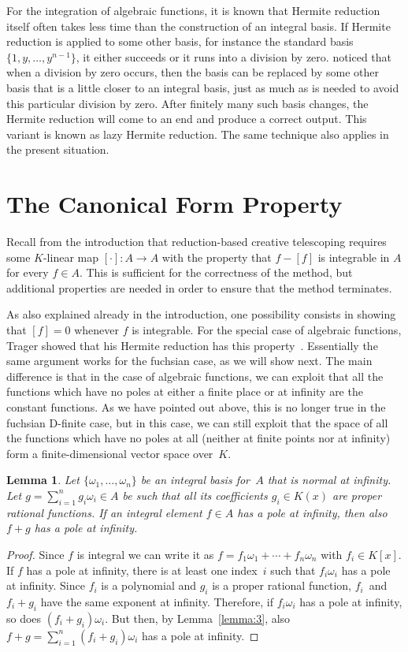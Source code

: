 \documentclass[final,1p,times,authoryear]{elsarticle}
\newtheorem{lemma}[theorem]{Lemma}
\begin{document}
For the integration of algebraic functions, it is known that Hermite reduction itself often
takes less time than the construction of an integral basis. If Hermite reduction is applied to some
other basis, for instance the standard basis $\{1,y,\dots,y^{n-1}\}$, it
either succeeds or it runs into a division by zero.
\cite{bronstein98a} noticed that when a division by zero occurs,
then the basis can be replaced by some other basis that is a little closer to
an integral basis, just as much as is needed to avoid this particular division
by zero. After finitely many such basis changes, the Hermite reduction will
come to an end and produce a correct output. This variant is known as lazy
Hermite reduction. The same technique also applies in the present situation.

\section{The Canonical Form Property}\label{sec:canonic}

Recall from the introduction that reduction-based creative telescoping requires
some $K$-linear map $[\cdot]\colon A\to A$ with the property that
$f-[f]$ is integrable in $A$ for every $f\in A$. This is sufficient for the
correctness of the method, but additional properties are needed in order to
ensure that the method terminates.

As also explained already in the introduction, one possibility consists in
showing that $[f]=0$ whenever $f$ is integrable. For the special case of
algebraic functions, Trager showed that his Hermite reduction has this
property~\citep[p.~50, Thm.~1]{trager84}. Essentially the same argument
works for the fuchsian case, as we will show next. The main difference is
that in the case of algebraic functions, we can exploit that all the functions
which have no poles at either a finite place or at infinity are the constant
functions. As we have pointed out above, this is no longer true in the fuchsian
D-finite case, but in this case, we can still exploit that the space of all
the functions which have no poles at all (neither at finite points nor at infinity)
form a finite-dimensional vector space over~$K$.

\begin{lemma}\label{lemma:pole_at_inf}
Let $\{\omega_1,\dots,\omega_n\}$ be an integral basis for~$A$ that is normal at
infinity. Let $g=\sum_{i=1}^ng_i\omega_i\in A$ be such that all its
coefficients $g_i\in K(x)$ are proper rational functions. If an integral
element $f\in A$ has a pole at infinity, then also $f+g$ has a pole at
infinity.
\end{lemma}
\begin{proof}
Since $f$ is integral we can write it as
$f=f_1\omega_1+\cdots+f_n\omega_n$ with $f_i\in K[x]$.
If $f$ has a pole at infinity, there is at least one index~$i$
such that $f_i\omega_i$ has a pole at infinity.
Since $f_i$ is a polynomial and $g_i$ is a proper rational function,
$f_i$~and $f_i+g_i$ have the same exponent at infinity.
Therefore, if $f_i\omega_i$ has a pole at infinity, so does $(f_i+g_i)\omega_i$.
But then, by Lemma~\ref{lemma:3}, also $f+g=\sum_{i=1}^n(f_i+g_i)\omega_i$ has
a pole at infinity.
\end{proof}
\end{document}
